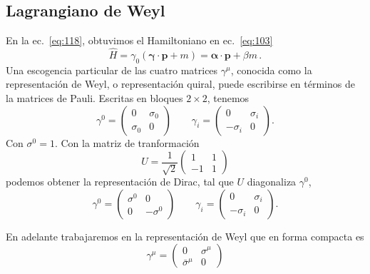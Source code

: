 \begin{subappendices}
\subsection{Lagrangiano de Weyl}
\label{sec:lagrangiano-de-weyl}
\begin{borrar}
En la ec.~\eqref{eq:118}, obtuvimos el Hamiltoniano en ec.~\eqref{eq:103}
\begin{equation}
  \hat{H}= \gamma_0(\boldsymbol{\gamma}\cdot\mathbf{p}+m)=\boldsymbol{\alpha}\cdot\mathbf{p}+\beta m\,.
\end{equation}
Una escogencia particular de las cuatro matrices $\gamma^\mu$, conocida como la representaci\'on de Weyl, o representaci\'on quiral, puede escribirse en t\'erminos de la matrices de Pauli. Escritas en bloques $2\times2$, tenemos
\begin{equation}
  \gamma^0=
  \begin{pmatrix}
    0&\sigma_0\\
    \sigma_0&0
  \end{pmatrix}\qquad
  \gamma_i=\begin{pmatrix}
    0&\sigma_i\\
    -\sigma_i&0
  \end{pmatrix}.
\end{equation}
Con $\sigma^0=1$. Con la matriz de tranformaci\'on
\begin{equation}
  U=\frac{1}{\sqrt{2}}
  \begin{pmatrix}
    1&1\\
    -1&1    
  \end{pmatrix}
\end{equation}
podemos obtener la representaci\'on de Dirac, tal que $U$ diagonaliza $\gamma^0$,
\begin{equation}
  \gamma^0=
  \begin{pmatrix}
    \sigma^0&0\\
    0&-\sigma^0
  \end{pmatrix}\qquad
  \gamma_i=\begin{pmatrix}
    0&\sigma_i\\
    -\sigma_i&0
  \end{pmatrix}.
\end{equation}
\end{borrar}
En adelante trabajaremos en la representaci\'on de Weyl que en forma compacta es
\begin{equation}
  \gamma^\mu=\begin{pmatrix}
    0&\sigma^\mu\\
    \bar{\sigma}^\mu & 0

\end{pmatrix}
\end{equation}
\end{subappendices}

